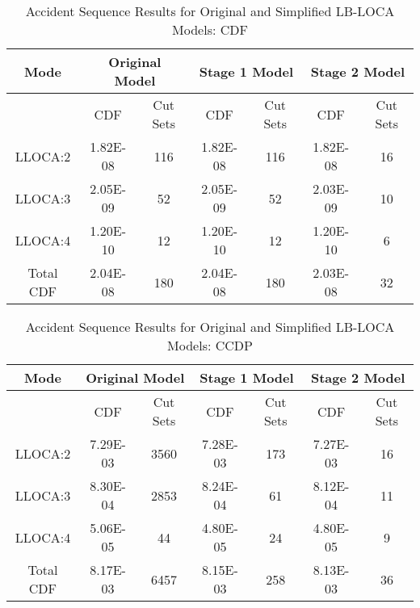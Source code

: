 \begin{table}
    \centering
    \caption{Accident Sequence Results for Original and Simplified LB-LOCA Models: CDF}
    \begin{tabular}{*7c}
        \hline 
        Mode &  \multicolumn{2}{c}{Original Model} & \multicolumn{2}{c}{Stage 1 Model} & \multicolumn{2}{c}{Stage 2 Model}\\
        \hline 
        {}        & CDF      & Cut Sets & CDF      & Cut Sets & CDF      & Cut Sets \\
        LLOCA:2   & 1.82E-08 & 116      & 1.82E-08 & 116      & 1.82E-08 & 16       \\
        LLOCA:3   & 2.05E-09 & 52       & 2.05E-09 & 52       & 2.03E-09 & 10       \\
        LLOCA:4   & 1.20E-10 & 12       & 1.20E-10 & 12       & 1.20E-10 & 6        \\
        Total CDF & 2.04E-08 & 180      & 2.04E-08 & 180      & 2.03E-08 & 32       \\
        \hline 
    \end{tabular}
    \label{tab:CDF}
\end{table}

\begin{table}
    \centering
    \caption{Accident Sequence Results for Original and Simplified LB-LOCA Models: CCDP}
    \begin{tabular}{*7c}
        \hline 
        Mode &  \multicolumn{2}{c}{Original Model} & \multicolumn{2}{c}{Stage 1 Model} & \multicolumn{2}{c}{Stage 2 Model}\\
        \hline 
        {}        & CDF      & Cut Sets & CDF      & Cut Sets & CDF      & Cut Sets \\
        LLOCA:2   & 7.29E-03 & 3560     & 7.28E-03 & 173      & 7.27E-03 & 16       \\
        LLOCA:3   & 8.30E-04 & 2853     & 8.24E-04 & 61       & 8.12E-04 & 11      \\
        LLOCA:4   & 5.06E-05 & 44       & 4.80E-05 & 24       & 4.80E-05 & 9        \\
        Total CDF & 8.17E-03 & 6457     & 8.15E-03 & 258      & 8.13E-03 & 36      \\
        \hline 
    \end{tabular}
    \label{tab:CCDP}
\end{table}


